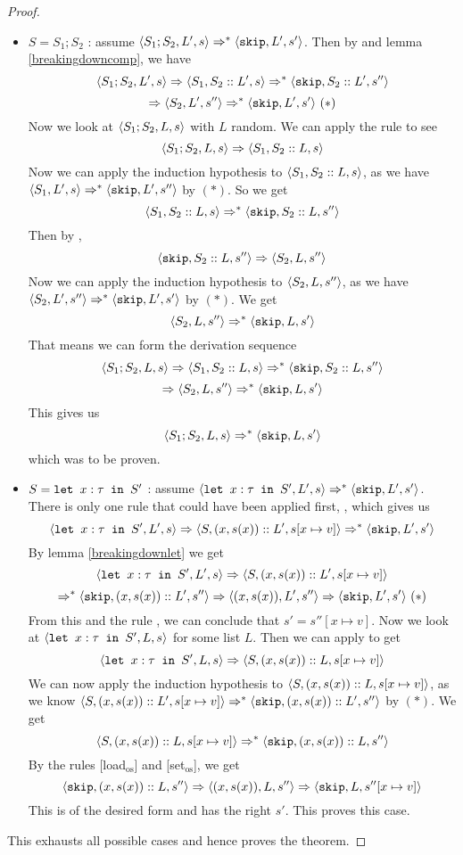 \begin{proof}
\begin{itemize}[noitemsep]
    \item $S = S_1; S_2$ : assume $\langle  S_1;S_2, L',  s \rangle \Rightarrow ^{*} \langle \texttt{skip}, L', s' \rangle$. Then by \compsos and lemma \ref{breakingdowncomp}, we have 
    $$\langle S_1;S_2, L', s \rangle \Rightarrow \langle S_1, S_2::L', s \rangle \Rightarrow ^{*} \langle \texttt{skip}, S_2::L', s'' \rangle$$ $$\Rightarrow \langle S_2, L', s'' \rangle \Rightarrow ^{*} \langle \texttt{skip}, L', s' \rangle ~( * )$$
    Now we look at $\langle S_1;S_2, L, s \rangle$ with $L$ random. We can apply the rule \compsos to see $$\langle S_1;S_2, L, s \rangle \Rightarrow \langle S_1, S_2::L, s \rangle$$ Now we can apply the induction hypothesis to $\langle S_1, S_2::L, s \rangle$, as we have $\langle S_1, L', s \rangle \Rightarrow ^{*} \langle \texttt{skip}, L', s'' \rangle$ by $( * )$. So we get 
    $$\langle S_1, S_2::L, s \rangle \Rightarrow ^{*} \langle \texttt{skip}, S_2::L, s'' \rangle$$
    Then by \loadsos, 
    $$\langle \texttt{skip}, S_2::L, s'' \rangle \Rightarrow \langle S_2, L, s'' \rangle$$
    Now we can apply the induction hypothesis to $\langle S_2, L, s'' \rangle$, as we have $\langle S_2, L', s'' \rangle \Rightarrow ^{*} \langle \texttt{skip}, L', s' \rangle$ by $( * )$. We get 
    $$\langle S_2, L, s'' \rangle \Rightarrow ^{*} \langle \texttt{skip}, L, s' \rangle$$
    That means we can form the derivation sequence $$\langle S_1;S_2, L, s \rangle \Rightarrow \langle S_1, S_2::L, s \rangle \Rightarrow ^{*} \langle \texttt{skip}, S_2::L, s'' \rangle $$ $$ \Rightarrow \langle S_2, L, s'' \rangle \Rightarrow ^{*} \langle \texttt{skip}, L, s' \rangle$$
    This gives us 
    $$\langle S_1;S_2, L, s \rangle \Rightarrow ^{*} \langle \texttt{skip}, L, s' \rangle$$
    which was to be proven. 
        
    \item $S = \texttt{let }x : \tau \texttt{ in } S'$ : assume $\langle \texttt{let }x : \tau \texttt{ in } S', L', s \rangle \Rightarrow ^{*} \langle \texttt{skip}, L', s' \rangle$. There is only one rule that could have been applied first, , which gives us 
    $$\langle \texttt{let }x : \tau \texttt{ in } S', L', s \rangle \Rightarrow \langle S, (x,s(x))::L', s[x\mapsto v] \rangle \Rightarrow ^{*} \langle \texttt{skip}, L', s' \rangle$$
    By lemma \ref{breakingdownlet} we get 
    $$\langle \texttt{let }x : \tau \texttt{ in } S', L', s \rangle \Rightarrow \langle S, (x,s(x))::L', s[x\mapsto v] \rangle$$ $$\Rightarrow ^{*} \langle \texttt{skip}, (x,s(x))::L', s'' \rangle \Rightarrow \langle (x,s(x)), L', s'' \rangle \Rightarrow \langle \texttt{skip}, L', s' \rangle ~ ( * )$$
    From this and the rule \setsos, we can conclude that $s' = s''[x\mapsto v]$.
    Now we look at $\langle \texttt{let }x : \tau \texttt{ in } S', L, s \rangle$ for some list $L$. Then we can apply  to get 
    $$\langle \texttt{let }x : \tau \texttt{ in } S', L, s \rangle \Rightarrow \langle S, (x,s(x))::L, s[x\mapsto v] \rangle$$
    We can now apply the induction hypothesis to $\langle S, (x,s(x))::L, s[x\mapsto v] \rangle$, as we know $\langle S, (x,s(x))::L', s[x\mapsto v] \rangle \Rightarrow ^{*} \langle \texttt{skip}, (x,s(x))::L', s'' \rangle$ by $( * )$. We get
    $$\langle S, (x,s(x))::L, s[x\mapsto v] \rangle \Rightarrow ^{*} \langle \texttt{skip}, (x,s(x))::L, s'' \rangle$$
    By the rules [load$_{\textrm{os}}$] and [set$_{\textrm{os}}$], we get 
    $$\langle \texttt{skip}, (x,s(x))::L, s'' \rangle \Rightarrow \langle (x,s(x)), L, s'' \rangle \Rightarrow \langle \texttt{skip}, L, s''[x \mapsto v] \rangle$$
    This is of the desired form and has the right $s'$. This proves this case.
\end{itemize}
This exhausts all possible cases and hence proves the theorem.
\end{proof}

